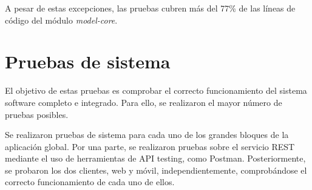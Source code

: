 A pesar de estas excepciones, las pruebas cubren más del 77\% de las líneas de código del módulo \textit{model-core}.


\section{Pruebas de sistema}
El objetivo de estas pruebas es comprobar el correcto funcionamiento del sistema software completo e integrado. Para ello, se realizaron el mayor número de pruebas posibles.

Se realizaron pruebas de sistema para cada uno de los grandes bloques de la aplicación global. Por una parte, se realizaron pruebas sobre el servicio REST mediante el uso de herramientas de API testing, como  Postman. Posteriormente, se probaron los dos clientes, web y móvil, independientemente, comprobándose el correcto funcionamiento de cada uno de ellos.

